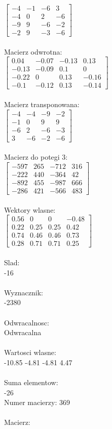 \documentclass[a4paper,12pt]{article}
\begin{document}
$\begin{bmatrix} -4&-1&-6&3\\-4&0&2&-6\\-9&9&-6&-2\\-2&9&-3&-6 \end{bmatrix}$
\\
\\
Macierz odwrotna:\\

$\begin{bmatrix} 0.04&-0.07&-0.13&0.13\\-0.13&-0.09&0.1&0\\-0.22&0&0.13&-0.16\\-0.1&-0.12&0.13&-0.14 \end{bmatrix}$
\\
\\
Macierz transponowana:\\

$\begin{bmatrix} -4&-4&-9&-2\\-1&0&9&9\\-6&2&-6&-3\\3&-6&-2&-6 \end{bmatrix}$
\\
\\
Macierz do potegi 3:\\

$\begin{bmatrix} -597&265&-712&316\\-222&440&-364&42\\-892&455&-987&666\\-286&421&-566&483 \end{bmatrix}$
\\
\\
Wektory wlasne:\\

$\begin{bmatrix} 0.56&0&0&-0.48\\0.22&0.25&0.25&0.42\\0.74&0.46&0.46&0.73\\0.28&0.71&0.71&0.25 \end{bmatrix}$
\\
\\
Slad:\\
-16
\\
\\
Wyznacznik:\\
-2380
\\
\\
Odwracalnosc:\\
Odwracalna
\\
\\
Wartosci wlasne:\\
-10.85 -4.81 -4.81 4.47
\\
\\
Suma elementow:\\
-26
\\
\newpage
Numer macierzy:
369
\\
\\
Macierz:\\
\end{document}
